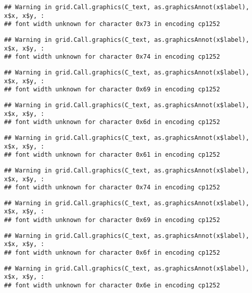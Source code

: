 \documentclass[
]{article}
\begin{document}
\begin{verbatim}
## Warning in grid.Call.graphics(C_text, as.graphicsAnnot(x$label), x$x, x$y, :
## font width unknown for character 0x73 in encoding cp1252
\end{verbatim}

\begin{verbatim}
## Warning in grid.Call.graphics(C_text, as.graphicsAnnot(x$label), x$x, x$y, :
## font width unknown for character 0x74 in encoding cp1252
\end{verbatim}

\begin{verbatim}
## Warning in grid.Call.graphics(C_text, as.graphicsAnnot(x$label), x$x, x$y, :
## font width unknown for character 0x69 in encoding cp1252
\end{verbatim}

\begin{verbatim}
## Warning in grid.Call.graphics(C_text, as.graphicsAnnot(x$label), x$x, x$y, :
## font width unknown for character 0x6d in encoding cp1252
\end{verbatim}

\begin{verbatim}
## Warning in grid.Call.graphics(C_text, as.graphicsAnnot(x$label), x$x, x$y, :
## font width unknown for character 0x61 in encoding cp1252
\end{verbatim}

\begin{verbatim}
## Warning in grid.Call.graphics(C_text, as.graphicsAnnot(x$label), x$x, x$y, :
## font width unknown for character 0x74 in encoding cp1252
\end{verbatim}

\begin{verbatim}
## Warning in grid.Call.graphics(C_text, as.graphicsAnnot(x$label), x$x, x$y, :
## font width unknown for character 0x69 in encoding cp1252
\end{verbatim}

\begin{verbatim}
## Warning in grid.Call.graphics(C_text, as.graphicsAnnot(x$label), x$x, x$y, :
## font width unknown for character 0x6f in encoding cp1252
\end{verbatim}

\begin{verbatim}
## Warning in grid.Call.graphics(C_text, as.graphicsAnnot(x$label), x$x, x$y, :
## font width unknown for character 0x6e in encoding cp1252
\end{verbatim}
\end{document}
